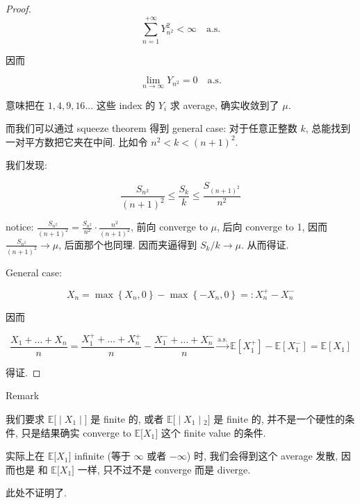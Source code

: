 \begin{proof}
\[\sum\limits_{\mathit{n} = 1}^{+ \infty}\mathit{Y}_{\mathit{n}^{2}}^{2} < \infty\quad\text{a.s.}\]

因而

\[\lim\limits_{\mathit{n}\rightarrow\infty}\mathit{Y}_{\mathit{n}^{2}} = 0\quad\text{a.s.}\]

意味把在 \(1,4,9,16...\) 这些 index 的 \(\mathit{Y}_{\mathit{i}}\) 求 average, 确实收敛到了 \(\mathit{\mu}\).

而我们可以通过 squeeze theorem 得到 general case: 对于任意正整数 \(\mathit{k}\), 总能找到一对平方数把它夹在中间. 比如令 \(\mathit{n}^{2} < \mathit{k} < (\mathit{n} + 1)^{2}\).

我们发现:

\[\frac{\mathit{S}_{\mathit{n}^{2}}}{(\mathit{n} + 1)^{2}} \leq \frac{\mathit{S}_{\mathit{k}}}{\mathit{k}} \leq \frac{\mathit{S}_{(\mathit{n} + 1)^{2}}}{\mathit{n}^{2}}\]

notice: \(\frac{\mathit{S}_{\mathit{n}^{2}}}{(\mathit{n} + 1)^{2}} = \frac{\mathit{S}_{\mathit{n}^{2}}}{\mathit{n}^{2}} \cdot \frac{\mathit{n}^{2}}{(\mathit{n} + 1)^{2}}\), 前向 converge to \(\mathit{\mu}\), 后向 converge to 1, 因而 \(\frac{\mathit{S}_{\mathit{n}^{2}}}{(\mathit{n} + 1)^{2}}\rightarrow\mathit{\mu}\), 后面那个也同理. 因而夹逼得到 \(\mathit{S}_{\mathit{k}}/\mathit{k}\rightarrow\mathit{\mu}\). 从而得证.

General case:

\[\mathit{X}_{\mathit{n}} = \max\left\{ {\mathit{X}_{\mathit{n}},0} \right\} - \max\left\{ {- \mathit{X}_{\mathit{n}},0} \right\} = :\mathit{X}_{\mathit{n}}^{+} - \mathit{X}_{\mathit{n}}^{-}\]

因而

\[\frac{\mathit{X}_{1} + \ldots + \mathit{X}_{\mathit{n}}}{\mathit{n}} = \frac{\mathit{X}_{1}^{+} + \ldots + \mathit{X}_{\mathit{n}}^{+}}{\mathit{n}} - \frac{\mathit{X}_{1}^{-} + \ldots + \mathit{X}_{\mathit{n}}^{-}}{\mathit{n}}\overset{\text{a.s.}}{\rightarrow}\mathbb{E}\left\lbrack \mathit{X}_{1}^{+} \right\rbrack - \mathbb{E}\left\lbrack \mathit{X}_{1}^{-} \right\rbrack = \mathbb{E}\left\lbrack \mathit{X}_{1} \right\rbrack\]

得证.

\end{proof}

\begin{qlremark}{Remark}

我们要求 \(\left. \mathbb{E}\lbrack \middle| \mathit{X}_{1} \middle| \rbrack \right.\) 是 finite 的, 或者 \(\left. \mathbb{E}\lbrack \middle| \mathit{X}_{1} \middle| {}_{2}\rbrack \right.\) 是 finite 的, 并不是一个硬性的条件, 只是结果确实 converge to \(\mathbb{E}\lbrack\mathit{X}_{1}\rbrack\) 这个 finite value 的条件.

实际上在 \(\mathbb{E}\lbrack\mathit{X}_{1}\rbrack\) infinite (等于 \(\infty\) 或者 \(- \infty\)) 时, 我们会得到这个 average 发散, 因而也是 和 \(\mathbb{E}\lbrack\mathit{X}_{1}\rbrack\) 一样, 只不过不是 converge 而是 diverge.

此处不证明了.

\end{qlremark}

